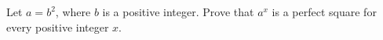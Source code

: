 Let $a=b^2$, where $b$ is a positive integer. Prove that $a^x$ is a perfect square for every positive integer $x$.
